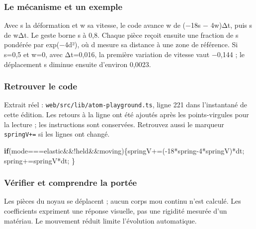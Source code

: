 \documentclass[
  canadien,
  11pt,
  letterpaper,
]{article}
\newenvironment{Shaded}{}{}
\newcommand{\ControlFlowTok}[1]{\textcolor[rgb]{0.00,0.44,0.13}{\textbf{#1}}}
\newcommand{\DecValTok}[1]{\textcolor[rgb]{0.25,0.63,0.44}{#1}}
\newcommand{\NormalTok}[1]{#1}
\newcommand{\OperatorTok}[1]{\textcolor[rgb]{0.40,0.40,0.40}{#1}}
\newcommand{\StringTok}[1]{\textcolor[rgb]{0.25,0.44,0.63}{#1}}
\begin{document}
\subsubsection{Le mécanisme et un
exemple}\label{le-muxe9canisme-et-un-exemple-3}

Avec s la déformation et w sa vitesse, le code avance w de (−18s −
4w)Δt, puis s de wΔt. Le geste borne s à 0,8. Chaque pièce reçoit
ensuite une fraction de s pondérée par exp(−4d²), où d mesure sa
distance à une zone de référence. Si s=0,5 et w=0, avec Δt=0,016, la
première variation de vitesse vaut −0,144 ; le déplacement s diminue
ensuite d'environ 0,0023.

\subsubsection{Retrouver le code}\label{retrouver-le-code-3}

Extrait réel : \texttt{web/src/lib/atom-playground.ts}, ligne 221 dans
l'instantané de cette édition. Les retours à la ligne ont été ajoutés
après les points-virgules pour la lecture ; les instructions sont
conservées. Retrouvez aussi le marqueur \texttt{springV+=} si les lignes
ont changé.

\begin{Shaded}
\begin{Highlighting}[]
\ControlFlowTok{if}\NormalTok{(mode}\OperatorTok{===}\StringTok{\textquotesingle{}elastic\textquotesingle{}}\OperatorTok{\&\&!}\NormalTok{held}\OperatorTok{\&\&}\NormalTok{moving)\{springV}\OperatorTok{+=}\NormalTok{(}\OperatorTok{{-}}\DecValTok{18}\OperatorTok{*}\NormalTok{spring}\OperatorTok{{-}}\DecValTok{4}\OperatorTok{*}\NormalTok{springV)}\OperatorTok{*}\NormalTok{dt}\OperatorTok{;}
\NormalTok{spring}\OperatorTok{+=}\NormalTok{springV}\OperatorTok{*}\NormalTok{dt}\OperatorTok{;}
\NormalTok{\}}
\end{Highlighting}
\end{Shaded}

\subsubsection{Vérifier et comprendre la
portée}\label{vuxe9rifier-et-comprendre-la-portuxe9e-3}

Les pièces du noyau se déplacent ; aucun corps mou continu n'est
calculé. Les coefficients expriment une réponse visuelle, pas une
rigidité mesurée d'un matériau. Le mouvement réduit limite l'évolution
automatique.
\end{document}
